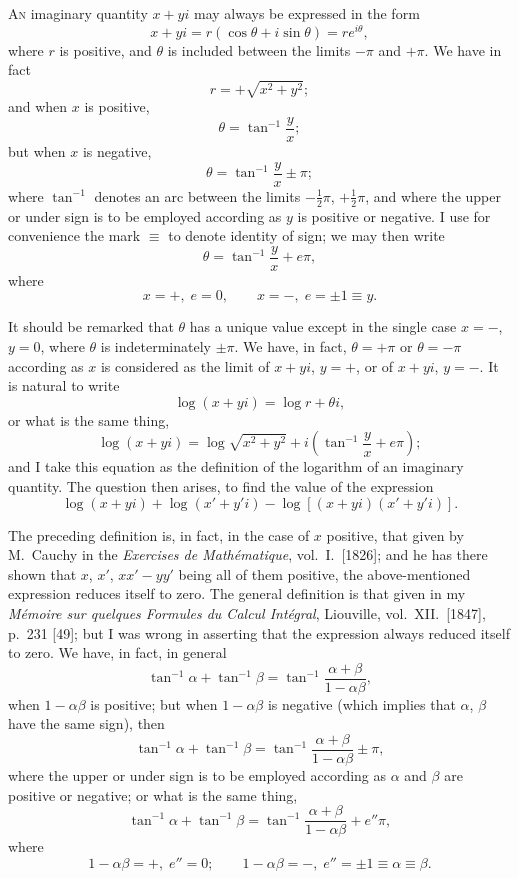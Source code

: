 \documentclass[11pt]{article}
\begin{document}
\medskip

\textsc{An} imaginary quantity $x+yi$ may always be expressed in the form
\[
x+yi = r(\cos\theta + i\sin\theta) = r e^{i\theta},
\]
where $r$ is positive, and $\theta$ is included between the limits $-\pi$ and $+\pi$. We have in fact
\[
r=+\sqrt{x^{2}+y^{2}};
\]
and when $x$ is positive,
\[
\theta=\tan^{-1}\frac{y}{x};
\]
but when $x$ is negative,
\[
\theta=\tan^{-1}\frac{y}{x}\pm\pi;
\]
where $\tan^{-1}$ denotes an arc between the limits $-\tfrac{1}{2}\pi$, $+\tfrac{1}{2}\pi$, and where the upper or under sign is to be employed according as $y$ is positive or negative. I use for convenience the mark $\equiv$ to denote identity of sign; we may then write
\[
\theta=\tan^{-1}\frac{y}{x}+e\pi,
\]
where
\[
x=+,\;e=0,\qquad x=-,\;e=\pm 1\equiv y.
\]

It should be remarked that $\theta$ has a unique value except in the single case $x=-$, $y=0$, where $\theta$ is indeterminately $\pm\pi$. We have, in fact, $\theta=+\pi$ or $\theta=-\pi$ according as $x$ is considered as the limit of $x+yi$, $y=+$, or of $x+yi$, $y=-$. It is natural to write
\[
\log(x+yi)=\log r + \theta i,
\]
or what is the same thing,
\[
\log(x+yi)=\log\sqrt{x^{2}+y^{2}}+i\!\left(\tan^{-1}\frac{y}{x}+e\pi\right);
\]
and I take this equation as the definition of the logarithm of an imaginary quantity. The question then arises, to find the value of the expression
\[
\log(x+yi)+\log(x'+y'i)-\log[(x+yi)(x'+y'i)].
\]

The preceding definition is, in fact, in the case of $x$ positive, that given by M.\ Cauchy in the \emph{Exercises de Math\'ematique}, vol.\ I.\ [1826]; and he has there shown that $x$, $x'$, $xx'-yy'$ being all of them positive, the above-mentioned expression reduces itself to zero. The general definition is that given in my \emph{M\'emoire sur quelques Formules du Calcul Int\'egral}, Liouville, vol.\ XII.\ [1847], p.\ 231 [49]; but I was wrong in asserting that the expression always reduced itself to zero. We have, in fact, in general
\[
\tan^{-1}\alpha + \tan^{-1}\beta = \tan^{-1}\frac{\alpha+\beta}{1-\alpha\beta},
\]
when $1-\alpha\beta$ is positive; but when $1-\alpha\beta$ is negative (which implies that $\alpha$, $\beta$ have the same sign), then
\[
\tan^{-1}\alpha + \tan^{-1}\beta = \tan^{-1}\frac{\alpha+\beta}{1-\alpha\beta}\pm\pi,
\]
where the upper or under sign is to be employed according as $\alpha$ and $\beta$ are positive or negative; or what is the same thing,
\[
\tan^{-1}\alpha + \tan^{-1}\beta = \tan^{-1}\frac{\alpha+\beta}{1-\alpha\beta}+e''\pi,
\]
where
\[
1-\alpha\beta=+,\;e''=0;\qquad 1-\alpha\beta=-,\;e''=\pm 1\equiv\alpha\equiv\beta.
\]
\end{document}
